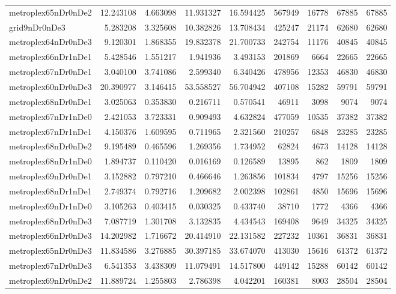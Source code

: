 \documentclass[../../../thesis.tex]{subfiles}
\begin{document}
\begin{longtable}{|l|r|r|r|r|r|r|r|r|}
metroplex65nDr0nDe2 & 12.243108 & 4.663098 & 11.931327 & 16.594425 & 567949 & 16778 & 67885 & 67885 \\
grid9nDr0nDe3 & 5.283208 & 3.325608 & 10.382826 & 13.708434 & 425247 & 21174 & 62680 & 62680 \\
metroplex64nDr0nDe3 & 9.120301 & 1.868355 & 19.832378 & 21.700733 & 242754 & 11176 & 40845 & 40845 \\
metroplex66nDr1nDe1 & 5.428546 & 1.551217 & 1.941936 & 3.493153 & 201869 & 6664 & 22665 & 22665 \\
metroplex67nDr0nDe1 & 3.040100 & 3.741086 & 2.599340 & 6.340426 & 478956 & 12353 & 46830 & 46830 \\
metroplex60nDr0nDe3 & 20.390977 & 3.146415 & 53.558527 & 56.704942 & 407108 & 15282 & 59791 & 59791 \\
metroplex68nDr0nDe1 & 3.025063 & 0.353830 & 0.216711 & 0.570541 & 46911 & 3098 & 9074 & 9074 \\
metroplex67nDr1nDe0 & 2.421053 & 3.723331 & 0.909493 & 4.632824 & 477059 & 10535 & 37382 & 37382 \\
metroplex67nDr1nDe1 & 4.150376 & 1.609595 & 0.711965 & 2.321560 & 210257 & 6848 & 23285 & 23285 \\
metroplex68nDr0nDe2 & 9.195489 & 0.465596 & 1.269356 & 1.734952 & 62824 & 4673 & 14128 & 14128 \\
metroplex68nDr1nDe0 & 1.894737 & 0.110420 & 0.016169 & 0.126589 & 13895 & 862 & 1809 & 1809 \\
metroplex69nDr0nDe1 & 3.152882 & 0.797210 & 0.466646 & 1.263856 & 101834 & 4797 & 15256 & 15256 \\
metroplex68nDr1nDe1 & 2.749374 & 0.792716 & 1.209682 & 2.002398 & 102861 & 4850 & 15696 & 15696 \\
metroplex69nDr1nDe0 & 3.105263 & 0.403415 & 0.030325 & 0.433740 & 38710 & 1772 & 4366 & 4366 \\
metroplex68nDr0nDe3 & 7.087719 & 1.301708 & 3.132835 & 4.434543 & 169408 & 9649 & 34325 & 34325 \\
metroplex66nDr0nDe3 & 14.202982 & 1.716672 & 20.414910 & 22.131582 & 227232 & 10361 & 36831 & 36831 \\
metroplex65nDr0nDe3 & 11.834586 & 3.276885 & 30.397185 & 33.674070 & 413030 & 15616 & 61372 & 61372 \\
metroplex67nDr0nDe3 & 6.541353 & 3.438309 & 11.079491 & 14.517800 & 449142 & 15288 & 60142 & 60142 \\
metroplex69nDr0nDe2 & 11.889724 & 1.255803 & 2.786398 & 4.042201 & 160381 & 8003 & 28504 & 28504 \\

\end{longtable}
\end{document}
